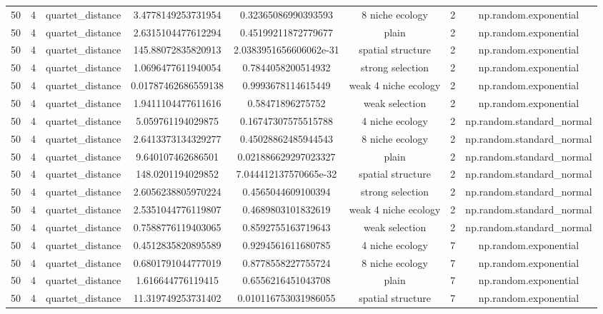 \begin{table}[h!]
\begin{tabular}{||c c c c c c c c||}
50 & 4 & quartet\_distance & 3.4778149253731954 & 0.32365086990393593 & 8 niche ecology & 2 & np.random.exponential \\ 
50 & 4 & quartet\_distance & 2.6315104477612294 & 0.45199211872779677 & plain & 2 & np.random.exponential \\ 
50 & 4 & quartet\_distance & 145.88072835820913 & 2.0383951656606062e-31 & spatial structure & 2 & np.random.exponential \\ 
50 & 4 & quartet\_distance & 1.0696477611940054 & 0.7844058200514932 & strong selection & 2 & np.random.exponential \\ 
50 & 4 & quartet\_distance & 0.01787462686559138 & 0.9993678114615449 & weak 4 niche ecology & 2 & np.random.exponential \\ 
50 & 4 & quartet\_distance & 1.9411104477611616 & 0.58471896275752 & weak selection & 2 & np.random.exponential \\ 
50 & 4 & quartet\_distance & 5.059761194029875 & 0.16747307575515788 & 4 niche ecology & 2 & np.random.standard\_normal \\ 
50 & 4 & quartet\_distance & 2.6413373134329277 & 0.45028862485944543 & 8 niche ecology & 2 & np.random.standard\_normal \\ 
50 & 4 & quartet\_distance & 9.640107462686501 & 0.021886629297023327 & plain & 2 & np.random.standard\_normal \\ 
50 & 4 & quartet\_distance & 148.0201194029852 & 7.044412137570665e-32 & spatial structure & 2 & np.random.standard\_normal \\ 
50 & 4 & quartet\_distance & 2.6056238805970224 & 0.4565044609100394 & strong selection & 2 & np.random.standard\_normal \\ 
50 & 4 & quartet\_distance & 2.5351044776119807 & 0.4689803101832619 & weak 4 niche ecology & 2 & np.random.standard\_normal \\ 
50 & 4 & quartet\_distance & 0.7588776119403065 & 0.8592755163719643 & weak selection & 2 & np.random.standard\_normal \\ 
50 & 4 & quartet\_distance & 0.4512835820895589 & 0.9294561611680785 & 4 niche ecology & 7 & np.random.exponential \\ 
50 & 4 & quartet\_distance & 0.6801791044777019 & 0.8778558227755724 & 8 niche ecology & 7 & np.random.exponential \\ 
50 & 4 & quartet\_distance & 1.616644776119415 & 0.6556216451043708 & plain & 7 & np.random.exponential \\ 
50 & 4 & quartet\_distance & 11.319749253731402 & 0.010116753031986055 & spatial structure & 7 & np.random.exponential \\ 

\end{tabular}
\end{table}
